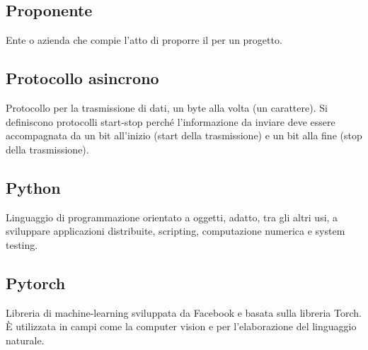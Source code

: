 \subsection*{Proponente}
Ente o azienda che compie l'atto di proporre il  per un progetto.

\subsection*{Protocollo asincrono}
Protocollo per la trasmissione di dati, un byte alla volta (un carattere). Si definiscono protocolli start-stop perché l'informazione da inviare deve essere accompagnata da un bit all'inizio (start della trasmissione) e un bit alla fine (stop della trasmissione).

\subsection*{Python}
Linguaggio di programmazione orientato a oggetti, adatto, tra gli altri usi, a sviluppare applicazioni distribuite, scripting, computazione numerica e system testing.

\subsection*{Pytorch}
Libreria  di machine-learning sviluppata da Facebook e basata sulla libreria Torch. È utilizzata in campi come la computer vision e per l'elaborazione del linguaggio naturale.


